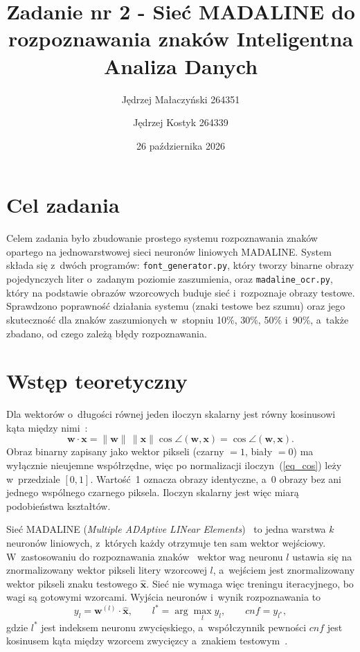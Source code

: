 \documentclass[12pt]{article}
\title{{\bf Zadanie nr 2 - Sieć MADALINE do rozpoznawania znaków}\linebreak
Inteligentna Analiza Danych}
\author{Jędrzej Małaczyński 264351 \and Jędrzej Kostyk 264339}
\date{26 października 2026}
\begin{document}
\clearpage\maketitle
\thispagestyle{empty}
\newpage
\setcounter{page}{1}
\section{Cel zadania}

Celem zadania było zbudowanie prostego systemu rozpoznawania znaków opartego na
jednowarstwowej sieci neuronów liniowych MADALINE. System składa się z~dwóch
programów: \texttt{font\_generator.py}, który tworzy binarne obrazy pojedynczych
liter o~zadanym poziomie zaszumienia, oraz \texttt{madaline\_ocr.py}, który na
podstawie obrazów wzorcowych buduje sieć i~rozpoznaje obrazy testowe. Sprawdzono
poprawność działania systemu (znaki testowe bez szumu) oraz jego skuteczność dla
znaków zaszumionych w~stopniu 10\%, 30\%, 50\% i~90\%, a~także zbadano, od czego
zależą błędy rozpoznawania.

\section{Wstęp teoretyczny}

Dla wektorów o~długości równej jeden iloczyn skalarny jest równy kosinusowi
kąta między nimi~\cite{wyklad1}:
\begin{equation}
 \mathbf{w}\cdot\mathbf{x} = \|\mathbf{w}\|\,\|\mathbf{x}\|\cos\angle(\mathbf{w},\mathbf{x}) = \cos\angle(\mathbf{w},\mathbf{x}).
 \label{eq_cos}
\end{equation}
Obraz binarny zapisany jako wektor pikseli (czarny $=1$, biały $=0$) ma wyłącznie
nieujemne współrzędne, więc po normalizacji iloczyn~(\ref{eq_cos}) leży w~przedziale
$[0,1]$. Wartość~1 oznacza obrazy identyczne, a~0 obrazy bez ani jednego wspólnego
czarnego piksela. Iloczyn skalarny jest więc miarą podobieństwa kształtów.

Sieć MADALINE (\textit{Multiple ADAptive LINear Elements})~\cite{widrow1990} to jedna
warstwa $k$ neuronów liniowych, z~których każdy otrzymuje ten sam wektor wejściowy.
W~zastosowaniu do rozpoznawania znaków~\cite{wyklad1} wektor wag neuronu $l$ ustawia się
na znormalizowany wektor pikseli litery wzorcowej $l$, a~wejściem jest znormalizowany
wektor pikseli znaku testowego $\hat{\mathbf{x}}$. Sieć nie wymaga więc treningu
iteracyjnego, bo wagi są gotowymi wzorcami. Wyjścia neuronów i~wynik rozpoznawania to
\begin{equation}
 y_l = \mathbf{w}^{(l)}\cdot\hat{\mathbf{x}}, \qquad
 l^{*} = \arg\max_{l} y_l, \qquad \mathit{cnf} = y_{l^{*}},
 \label{eq_madaline}
\end{equation}
gdzie $l^{*}$ jest indeksem neuronu zwycięskiego, a~współczynnik pewności $\mathit{cnf}$
jest kosinusem kąta między wzorcem zwycięzcy a~znakiem testowym~\cite{wyklad2}.
\end{document}
